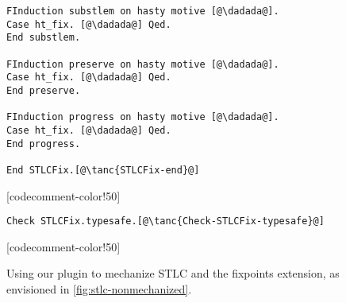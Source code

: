 \begin{figure}
\begin{minipage}{\textwidth}
\begin{multicols}{2}
\begin{lstlisting}[firstnumber=77]
FInduction substlem on hasty motive [@\dadada@].
Case ht_fix. [@\dadada@] Qed.
End substlem.

FInduction preserve on hasty motive [@\dadada@].
Case ht_fix. [@\dadada@] Qed.
End preserve.

FInduction progress on hasty motive [@\dadada@].
Case ht_fix. [@\dadada@] Qed.
End progress.

End STLCFix.[@\tanc{STLCFix-end}@]
\end{lstlisting}

[codecomment-color!50]

\vspace{-8pt}


\begin{lstlisting}[firstnumber=111]
Check STLCFix.typesafe.[@\tanc{Check-STLCFix-typesafe}@]
\end{lstlisting}

[codecomment-color!50]

\end{multicols}
\end{minipage}
\caption{Using our plugin to mechanize STLC and the fixpoints extension,
as envisioned in \cref{fig:stlc-nonmechanized}.}
\label{fig:stlc-mechanized}
\end{figure}




\ifShowOldWriting

